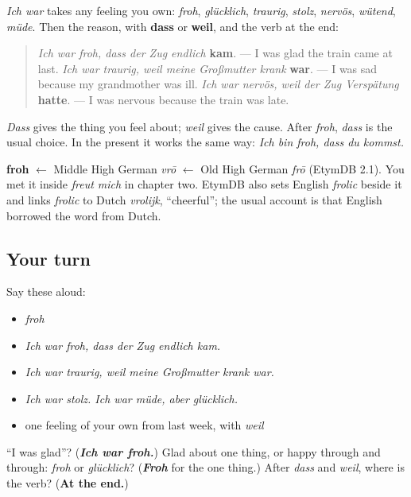 \begin{grammarlens}[title={Grammar Lens: the feeling, then the reason}]
\emph{Ich war} takes any feeling you own: \emph{froh}, \emph{glücklich}, \emph{traurig}, \emph{stolz}, \emph{nervös}, \emph{wütend}, \emph{müde}. Then the reason, with \textbf{dass} or \textbf{weil}, and the verb at the end:

\begin{quote}
\emph{Ich war froh, dass der Zug endlich} \textbf{kam}. — I was glad the train came at last. \emph{Ich war traurig, weil meine Großmutter krank} \textbf{war}. — I was sad because my grandmother was ill. \emph{Ich war nervös, weil der Zug Verspätung} \textbf{hatte}. — I was nervous because the train was late.
\end{quote}

\emph{Dass} gives the thing you feel about; \emph{weil} gives the cause. After \emph{froh}, \emph{dass} is the usual choice. In the present it works the same way: \emph{Ich bin froh, dass du kommst.}
\end{grammarlens}

\begin{cousinweb}
\textbf{froh} $\leftarrow$ Middle High German \emph{vrō} $\leftarrow$ Old High German \emph{frō} (EtymDB 2.1). You met it inside \emph{freut mich} in chapter two. EtymDB also sets English \emph{frolic} beside it and links \emph{frolic} to Dutch \emph{vrolijk}, \textquotedblleft{}cheerful\textquotedblright{}; the usual account is that English borrowed the word from Dutch.
\end{cousinweb}

\subsection*{Your turn}
Say these aloud:

\begin{itemize}
\raggedright
  \item \emph{froh}
  \item \emph{Ich war froh, dass der Zug endlich kam.}
  \item \emph{Ich war traurig, weil meine Großmutter krank war.}
  \item \emph{Ich war stolz. Ich war müde, aber glücklich.}
  \item one feeling of your own from last week, with \emph{weil}
\end{itemize}

\begin{tcolorbox}[breakable,colback=teal!4,colframe=teal!35!black,title={Before you move on}]
\textquotedblleft{}I was glad\textquotedblright{}? (\emph{\textbf{Ich war froh.}}) Glad about one thing, or happy through and through: \emph{froh} or \emph{glücklich}? (\emph{\textbf{Froh}} for the one thing.) After \emph{dass} and \emph{weil}, where is the verb? (\textbf{At the end.})
\end{tcolorbox}
